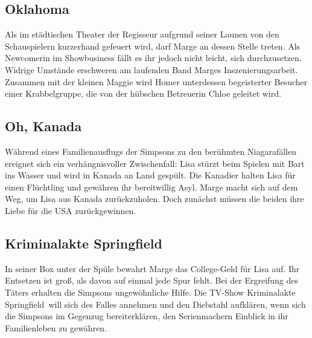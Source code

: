 \subsection{Oklahoma}
Als im städtischen Theater der Regisseur aufgrund seiner Launen von den Schauspielern kurzerhand gefeuert wird, darf Marge an dessen Stelle treten. Als Newcomerin im Showbusiness fällt es ihr jedoch nicht leicht, sich durchzusetzen. Widrige Umstände erschweren am laufenden Band Marges Inszenierungsarbeit. Zusammen mit der kleinen Maggie wird Homer unterdessen begeisterter Besucher einer Krabbelgruppe, die von der hübschen Betreuerin Chloe geleitet wird.


\subsection{Oh, Kanada}
Während eines Familienausflugs der Simpsons zu den berühmten Niagarafällen ereignet sich ein verhängnisvoller Zwischenfall: Lisa stürzt beim Spielen mit Bart ins Wasser und wird in Kanada an Land gespült. Die Kanadier halten Lisa für einen Flüchtling und gewähren ihr bereitwillig Asyl. Marge macht sich auf dem Weg, um Lisa aus Kanada zurückzuholen. Doch zunächst müssen die beiden ihre Liebe für die USA zurückgewinnen.


\subsection{Kriminalakte Springfield}
In seiner Box unter der Spüle bewahrt Marge das College-Geld für Lisa auf. Ihr Entsetzen ist groß, als davon auf einmal jede Spur fehlt. Bei der Ergreifung des Täters erhalten die Simpsons ungewöhnliche Hilfe. Die TV-Show \glqq Kriminalakte Springfield\grqq\ will sich des Falles annehmen und den Diebstahl aufklären, wenn sich die Simpsons im Gegenzug bereiterklären, den Serienmachern Einblick in ihr Familienleben zu gewähren.

